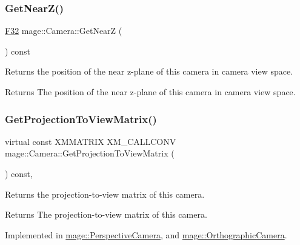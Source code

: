 \subsubsection{\texorpdfstring{Get\+Near\+Z()}{GetNearZ()}}
{\footnotesize\ttfamily \hyperlink{namespacemage_aa97e833b45f06d60a0a9c4fc22ae02c0}{F32} mage\+::\+Camera\+::\+Get\+NearZ (\begin{DoxyParamCaption}{ }\end{DoxyParamCaption}) const\hspace{0.3cm}{\ttfamily [noexcept]}}

Returns the position of the near z-\/plane of this camera in camera view space.

\begin{DoxyReturn}{Returns}
The position of the near z-\/plane of this camera in camera view space. 
\end{DoxyReturn}
\hypertarget{classmage_1_1_camera_a9259dee9eeee754a1392cca88f428d29}{}\label{classmage_1_1_camera_a9259dee9eeee754a1392cca88f428d29} 
\subsubsection{\texorpdfstring{Get\+Projection\+To\+View\+Matrix()}{GetProjectionToViewMatrix()}}
{\footnotesize\ttfamily virtual const X\+M\+M\+A\+T\+R\+IX X\+M\+\_\+\+C\+A\+L\+L\+C\+O\+NV mage\+::\+Camera\+::\+Get\+Projection\+To\+View\+Matrix (\begin{DoxyParamCaption}{ }\end{DoxyParamCaption}) const\hspace{0.3cm}{\ttfamily [pure virtual]}, {\ttfamily [noexcept]}}

Returns the projection-\/to-\/view matrix of this camera.

\begin{DoxyReturn}{Returns}
The projection-\/to-\/view matrix of this camera. 
\end{DoxyReturn}


Implemented in \hyperlink{classmage_1_1_perspective_camera_ac0353864cc0eafe5ea6af54b2b860992}{mage\+::\+Perspective\+Camera}, and \hyperlink{classmage_1_1_orthographic_camera_a7bbc235a85877c12b60d1a56d5b65108}{mage\+::\+Orthographic\+Camera}.

\hypertarget{classmage_1_1_camera_af4077967b2b676bc66226fd7a5d15220}{}\label{classmage_1_1_camera_af4077967b2b676bc66226fd7a5d15220} 
